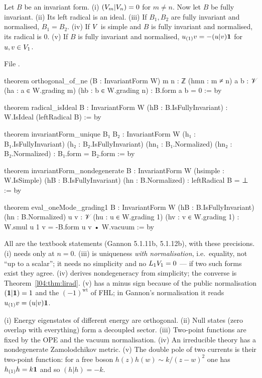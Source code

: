 \begin{theorem}\label{l04:thm:formbasics}
Let $B$ be an invariant form. (i) $(V_m|V_n) = 0$ for $m\ne n$. Now let $B$ be fully invariant.
(ii) Its left radical is an ideal. (iii) If $B_1,B_2$ are fully invariant and normalised, $B_1 = B_2$.
(iv) If $V$ is simple and $B$ is fully invariant and normalised, its radical is $0$. (v) If $B$ is
fully invariant and normalised, $u_{(1)}v = -(u|v)\mathbf{1}$ for $u,v\in V_1$.
\end{theorem}
\noindent File .
\begin{leancode}
theorem orthogonal_of_ne (B : InvariantForm W) {m n : ℤ} (hmn : m ≠ n) {a b : 𝒱}
    (ha : a ∈ W.grading m) (hb : b ∈ W.grading n) : B.form a b = 0 := by

theorem radical_isIdeal {B : InvariantForm W} (hB : B.IsFullyInvariant) :
    W.IsIdeal (leftRadical B) := by

theorem invariantForm_unique {B₁ B₂ : InvariantForm W}
    (h₁ : B₁.IsFullyInvariant) (h₂ : B₂.IsFullyInvariant)
    (hn₁ : B₁.Normalized) (hn₂ : B₂.Normalized) : B₁.form = B₂.form := by

theorem invariantForm_nondegenerate {B : InvariantForm W} (hsimple : W.IsSimple)
    (hB : B.IsFullyInvariant) (hn : B.Normalized) : leftRadical B = ⊥ := by

theorem eval_oneMode_grading1 {B : InvariantForm W} (hB : B.IsFullyInvariant)
    (hn : B.Normalized) {u v : 𝒱} (hu : u ∈ W.grading 1) (hv : v ∈ W.grading 1) :
    W.smul u 1 v = -B.form u v • W.vacuum := by
\end{leancode}
\begin{dictionary}
All are the textbook statements (Gannon 5.1.11b, 5.1.12b), with these precisions. (i) needs only
 at $n = 0$. (iii) is uniqueness \emph{with normalisation}, i.e.\ equality, not
``up to a scalar''; it needs no simplicity and no $L_1V_1 = 0$ --- if two such forms exist they
agree. (iv) derives nondegeneracy from simplicity; the converse is Theorem~\ref{l04:thm:lirad}. (v) has a
minus sign because of the public normalisation $(\mathbf{1}|\mathbf{1}) = 1$ and the $(-1)^{\mathrm{wt}}$ of
FHL; in Gannon's normalisation it reads $u_{(1)}v = (u|v)\mathbf{1}$.
\end{dictionary}
\begin{physics}
(i) Energy eigenstates of different energy are orthogonal. (ii) Null states (zero overlap with
everything) form a decoupled sector. (iii) Two-point functions are fixed by the OPE and the vacuum
normalisation. (iv) An irreducible theory has a nondegenerate Zamolodchikov metric. (v) The double pole of
two currents is their two-point function: for a free boson $h(z)h(w)\sim k/(z-w)^2$ one has $h_{(1)}h =
k\mathbf{1}$ and so $(h|h) = -k$.
\end{physics}
